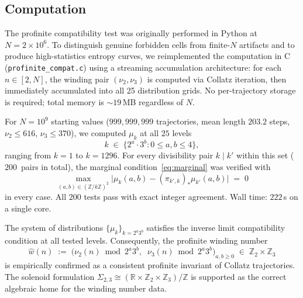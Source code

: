 \documentclass[11pt,a4paper]{article}
\newcommand{\Z}{\mathbb{Z}}
\newcommand{\R}{\mathbb{R}}
\theoremstyle{plain}
\theoremstyle{definition}
\begin{document}
\subsection{Computation}

The profinite compatibility test was originally performed in Python
at $N = 2 \times 10^6$.  To distinguish genuine forbidden cells from
finite-$N$ artifacts and to produce high-statistics entropy curves,
we reimplemented the computation in C (\texttt{profinite\_compat.c})
using a streaming accumulation architecture: for each $n \in [2, N]$,
the winding pair $(\nu_2, \nu_3)$ is computed via Collatz iteration,
then immediately accumulated into all 25 distribution grids.  No
per-trajectory storage is required; total memory is ${\sim}19$\,MB
regardless of $N$.

\begin{empirical}
\label{obs:profinite-compat}
    For $N = 10^9$ starting values ($999{,}999{,}999$ trajectories,
    mean length $203.2$ steps, $\nu_2 \leq 616$, $\nu_3 \leq 370$),
    we computed $\mu_k$ at all $25$ levels
    \begin{equation}\label{eq:level-set}
        k \;\in\; \bigl\{2^a \cdot 3^b : 0 \leq a, b \leq 4\bigr\},
    \end{equation}
    ranging from $k = 1$ to $k = 1296$.
    For every divisibility pair $k \mid k'$ within this set
    ($200$~pairs in total), the marginal condition~\eqref{eq:marginal}
    was verified with
    \begin{equation}
        \max_{(a,b) \in (\Z/k\Z)^2}
        \bigl|\mu_k(a,b) - (\pi_{k',k})_* \mu_{k'}(a,b)\bigr| \;=\; 0
    \end{equation}
    in every case.  All $200$ tests pass with exact integer agreement.
    Wall time: $222$\,s on a single core.
\end{empirical}

\begin{mainresult}
    The system of distributions $\{\mu_k\}_{k = 2^a 3^b}$ satisfies
    the inverse limit compatibility condition at all tested levels.
    Consequently, the profinite winding number
    \begin{equation}
        \hat{w}(n) \;:=\; \bigl(\nu_2(n) \bmod 2^a 3^b, \;\;
        \nu_3(n) \bmod 2^a 3^b\bigr)_{a,b \geq 0}
        \;\in\; \Z_2 \times \Z_3
    \end{equation}
    is empirically confirmed as a consistent profinite invariant of
    Collatz trajectories.  The solenoid formulation
    $\Sigma_{2,3} \cong (\R \times \Z_2 \times \Z_3)/\Z$ is supported
    as the correct algebraic home for the winding number data.
\end{mainresult}
\end{document}
